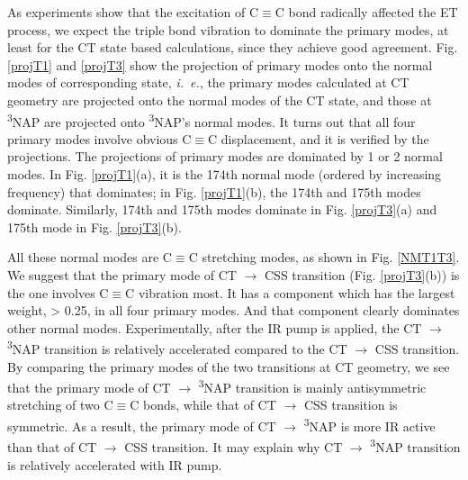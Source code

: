 As experiments show that the excitation of C$\equiv$C bond radically affected the ET process, we expect the triple bond vibration to dominate the primary modes, at least for the CT state based calculations, since they achieve good agreement. Fig. \ref{projT1} and \ref{projT3} show the projection of primary modes onto the normal modes of corresponding state, {\em i.~e.}, the primary modes calculated at CT geometry are projected onto the normal modes of the CT state, and those at \textsuperscript{3}NAP are projected onto \textsuperscript{3}NAP's normal modes. It turns out that all four primary modes involve obvious C$\equiv$C displacement, and it is verified by the projections. The projections of primary modes are dominated by 1 or 2 normal modes. In Fig. \ref{projT1}(a), it is the 174th normal mode (ordered by increasing frequency) that dominates; in Fig. \ref{projT1}(b), the 174th and 175th modes dominate. Similarly, 174th and 175th modes dominate in Fig. \ref{projT3}(a) and  175th mode in Fig. \ref{projT3}(b).

All these normal modes are C$\equiv$C stretching modes, as shown in Fig. \ref{NMT1T3}. We suggest that the primary mode of  CT $\rightarrow$ CSS transition (Fig. \ref{projT3}(b)) is the one involves C$\equiv$C vibration most. It has a component which has the largest weight, > 0.25, in all four primary modes. And that component clearly dominates other normal modes. Experimentally, after the IR pump is applied, the CT $\rightarrow$  \textsuperscript{3}NAP transition is relatively accelerated compared to the CT $\rightarrow$ CSS transition. By comparing the primary modes of the two transitions at CT geometry, we see that the primary mode of CT $\rightarrow$  \textsuperscript{3}NAP transition  is mainly antisymmetric stretching of two C$\equiv$C bonds, while that of CT $\rightarrow$ CSS transition is symmetric. As a result, the primary mode of CT $\rightarrow$  \textsuperscript{3}NAP is more IR active than that of CT $\rightarrow$ CSS transition. It may explain why CT $\rightarrow$  \textsuperscript{3}NAP  transition is relatively accelerated with IR pump.






